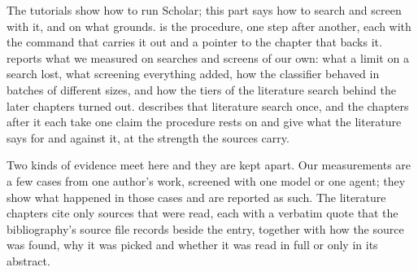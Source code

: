 
The tutorials show how to run Scholar; this part says how to search and
screen with it, and on what grounds.
 is the procedure, one step after another, each with
the command that carries it out and a pointer to the chapter that backs
it.
 reports what we measured on searches and screens of
our own: what a limit on a search lost, what screening everything added,
how the classifier behaved in batches of different sizes, and how the
tiers of the literature search behind the later chapters turned out.
 describes that literature search once, and the
chapters after it each take one claim the procedure rests on and give
what the literature says for and against it, at the strength the sources
carry.

Two kinds of evidence meet here and they are kept apart.
Our measurements are a few cases from one author's work, screened with
one model or one agent; they show what happened in those cases and are
reported as such.
The literature chapters cite only sources that were read, each with a
verbatim quote that the bibliography's source file records beside the
entry, together with how the source was found, why it was picked and
whether it was read in full or only in its abstract.









